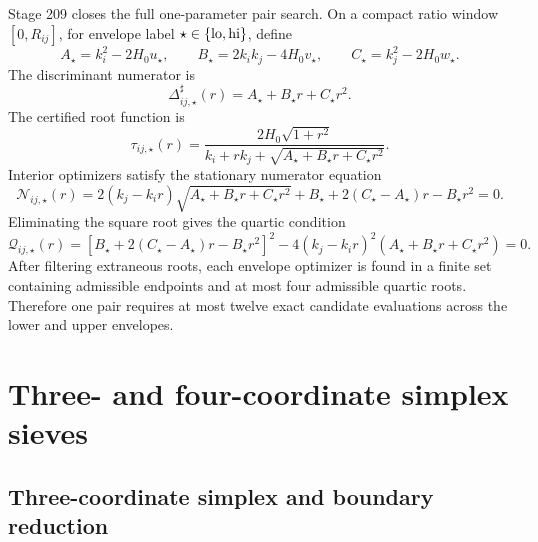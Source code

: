 Stage 209 closes the full one-parameter pair search.  On a compact ratio window \([0,R_{ij}]\), for envelope label \(\star\in\{\rm lo,hi\}\), define
\begin{equation}
\label{eq:part06-pairwise-ABC}
A_\star=k_i^2-2H_0u_\star,
\qquad
B_\star=2k_ik_j-4H_0v_\star,
\qquad
C_\star=k_j^2-2H_0w_\star.
\end{equation}
The discriminant numerator is
\begin{equation}
\label{eq:part06-pairwise-discriminant-numerator}
\Delta_{ij,\star}^{\sharp}(r)=A_\star+B_\star r+C_\star r^2.
\end{equation}
The certified root function is
\begin{equation}
\label{eq:part06-pairwise-root-function}
\tau_{ij,\star}(r)=
\frac{2H_0\sqrt{1+r^2}}
{k_i+rk_j+\sqrt{A_\star+B_\star r+C_\star r^2}}.
\end{equation}
Interior optimizers satisfy the stationary numerator equation
\begin{equation}
\label{eq:part06-pairwise-stationary-numerator}
\mathcal N_{ij,\star}(r)=
2(k_j-k_ir)\sqrt{A_\star+B_\star r+C_\star r^2}
+B_\star+2(C_\star-A_\star)r-B_\star r^2=0.
\end{equation}
Eliminating the square root gives the quartic condition
\begin{equation}
\label{eq:part06-pairwise-quartic}
\mathcal Q_{ij,\star}(r)=
\left[B_\star+2(C_\star-A_\star)r-B_\star r^2\right]^2
-4(k_j-k_ir)^2(A_\star+B_\star r+C_\star r^2)=0.
\end{equation}
After filtering extraneous roots, each envelope optimizer is found in a finite set containing admissible endpoints and at most four admissible quartic roots.  Therefore one pair requires at most twelve exact candidate evaluations across the lower and upper envelopes.


\section{Three- and four-coordinate simplex sieves}
\label{sec:part06-three-four-coordinate-simplex-sieves}

\subsection{Three-coordinate simplex and boundary reduction}
\label{subsec:part06-three-simplex-boundary-reduction}

